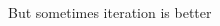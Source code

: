 \documentclass[notes,11pt, aspectratio=169]{beamer}
\begin{document}
\begin{frame}{But sometimes iteration is better}
\begin{columns}[T]
\begin{column}{.58\textwidth}
\end{column}
\end{columns}
\end{frame}
\end{document}
